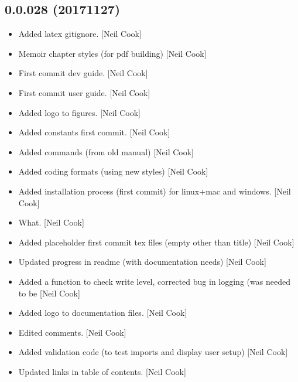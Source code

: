\documentclass[a4paper,10pt,english]{report}
\begin{document}
\subsection{0.0.028 (2017\sphinxhyphen{}11\sphinxhyphen{}27)}
\label{\detokenize{misc/changelog:id542}}\begin{itemize}
\item {} 
Added latex gitignore. {[}Neil Cook{]}

\item {} 
Memoir chapter styles (for pdf building) {[}Neil Cook{]}

\item {} 
First commit dev guide. {[}Neil Cook{]}

\item {} 
First commit user guide. {[}Neil Cook{]}

\item {} 
Added logo to figures. {[}Neil Cook{]}

\item {} 
Added constants first commit. {[}Neil Cook{]}

\item {} 
Added commands (from old manual) {[}Neil Cook{]}

\item {} 
Added coding formats (using new styles) {[}Neil Cook{]}

\item {} 
Added installation process (first commit) for linux+mac and windows.
{[}Neil Cook{]}

\item {} 
What. {[}Neil Cook{]}

\item {} 
Added placeholder first commit tex files (empty other than title)
{[}Neil Cook{]}

\item {} 
Updated progress in readme (with documentation needs) {[}Neil Cook{]}

\item {} 
Added a function to check write level, corrected bug in logging (was
 needed to be  {[}Neil Cook{]}

\item {} 
Added logo to documentation files. {[}Neil Cook{]}

\item {} 
Edited comments. {[}Neil Cook{]}

\item {} 
Added validation code (to test imports and display user setup) {[}Neil
Cook{]}

\item {} 
Updated links in table of contents. {[}Neil Cook{]}

\end{itemize}
\end{document}

